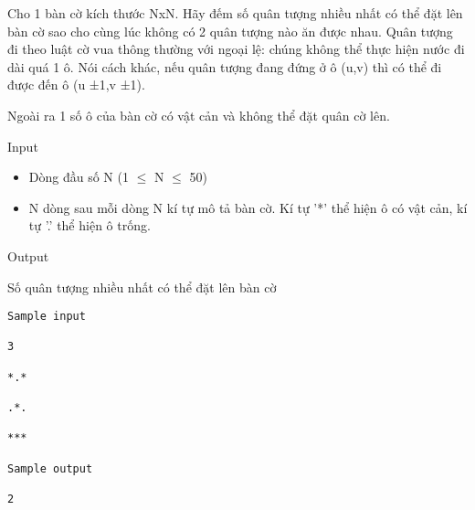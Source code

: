 

Cho 1 bàn cờ kích thước NxN. Hãy đếm số quân tượng nhiều nhất có thể đặt lên bàn cờ sao cho cùng lúc không có 2 quân tượng nào ăn được nhau. Quân tượng đi theo luật cờ vua thông thường với ngoại lệ: chúng không thể thực hiện nước đi dài quá 1 ô. Nói cách khác, nếu quân tượng đang đứng ở ô (u,v) thì có thể đi được đến ô (u ±1,v ±1).

Ngoài ra 1 số ô của bàn cờ có vật cản và không thể đặt quân cờ lên.

Input
\begin{itemize}
	\item Dòng đầu số N (1  $\le$  N  $\le$  50)
	\item N dòng sau mỗi dòng N kí tự mô tả bàn cờ. Kí tự '*' thể hiện ô có vật cản, kí tự '.' thể hiện ô trống.
\end{itemize}

Output

Số quân tượng nhiều nhất có thể đặt lên bàn cờ
\begin{verbatim}
Sample input

3

*.*

.*.

***

Sample output

2\end{verbatim}
